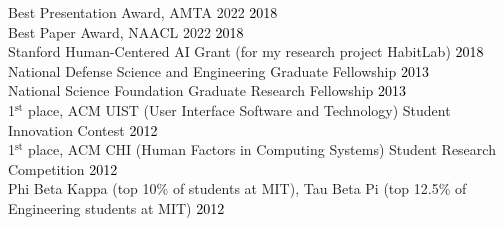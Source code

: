 {}

Best Presentation Award, AMTA 2022 \hfill \textcolor{black}{2018}\\ %
Best Paper Award, NAACL 2022 \hfill \textcolor{black}{2018}\\ %
Stanford Human-Centered AI Grant (for my research project HabitLab) \hfill \textcolor{black}{2018}\\ %
National Defense Science and Engineering Graduate Fellowship \hfill \textcolor{black}{2013}\\ %
National Science Foundation Graduate Research Fellowship \hfill \textcolor{black}{2013}\\ %
1$^{\textrm{st}}$ place, ACM UIST (User Interface Software and Technology) Student Innovation Contest \hfill \textcolor{black}{2012}\\
1$^{\textrm{st}}$ place, ACM CHI (Human Factors in Computing Systems) Student Research Competition \hfill \textcolor{black}{2012}\\
Phi Beta Kappa (top 10\% of students at MIT), Tau Beta Pi (top 12.5\% of Engineering students at MIT) \hfill \textcolor{black}{2012}\\
